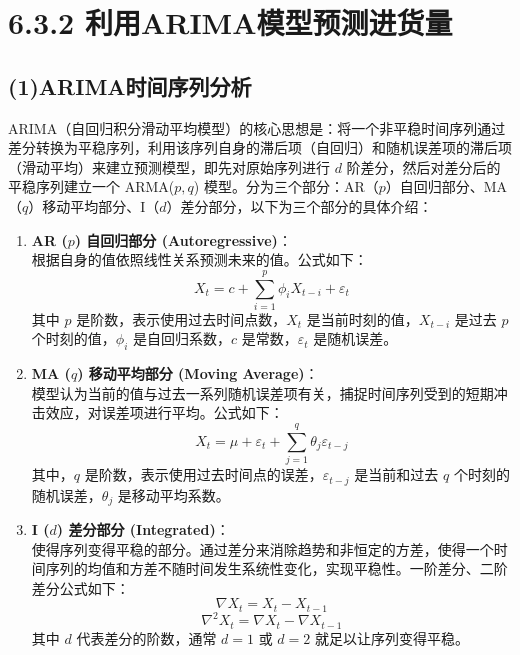 \documentclass{article}
\begin{document}
	
	\section*{6.3.2 利用ARIMA模型预测进货量}
	
	\subsection*{(1)ARIMA时间序列分析}
	
	ARIMA（自回归积分滑动平均模型）的核心思想是：将一个非平稳时间序列通过差分转换为平稳序列，利用该序列自身的滞后项（自回归）和随机误差项的滞后项（滑动平均）来建立预测模型，即先对原始序列进行 \(d\) 阶差分，然后对差分后的平稳序列建立一个 ARMA(\(p,q\)) 模型。分为三个部分：AR（\(p\)）自回归部分、MA（\(q\)）移动平均部分、I（\(d\)）差分部分，以下为三个部分的具体介绍：
	
	\begin{enumerate}[label=\arabic*)]
		\item \textbf{AR (\(p\)) 自回归部分 (Autoregressive)}：\\
		根据自身的值依照线性关系预测未来的值。公式如下：
		\begin{equation}
		X_t = c + \sum_{i=1}^{p} \phi_i X_{t-i} + \varepsilon_t 
		\end{equation}
		其中 \(p\) 是阶数，表示使用过去时间点数，\(X_t\) 是当前时刻的值，\(X_{t-i}\) 是过去 \(p\) 个时刻的值，\(\phi_i\) 是自回归系数，\(c\) 是常数，\(\varepsilon_t\) 是随机误差。
		
		\item \textbf{MA (\(q\)) 移动平均部分 (Moving Average)}：\\
		模型认为当前的值与过去一系列随机误差项有关，捕捉时间序列受到的短期冲击效应，对误差项进行平均。公式如下：
		\begin{equation}
		X_t = \mu + \varepsilon_t + \sum_{j=1}^{q} \theta_j \varepsilon_{t-j} 
		\end{equation}
		其中，\(q\) 是阶数，表示使用过去时间点的误差，\(\varepsilon_{t-j}\) 是当前和过去 \(q\) 个时刻的随机误差，\(\theta_j\) 是移动平均系数。
		
		\item \textbf{I (\(d\)) 差分部分 (Integrated)}：\\
		使得序列变得平稳的部分。通过差分来消除趋势和非恒定的方差，使得一个时间序列的均值和方差不随时间发生系统性变化，实现平稳性。一阶差分、二阶差分公式如下：
		\begin{equation}
		\nabla X_t = X_t - X_{t-1} \tag{3}
		\end{equation}
		\begin{equation}
		\nabla^2 X_t = \nabla X_t - \nabla X_{t-1} \tag{4}
		\end{equation}
		其中 \(d\) 代表差分的阶数，通常 \(d=1\) 或 \(d=2\) 就足以让序列变得平稳。
	\end{enumerate}
	
\end{document}
